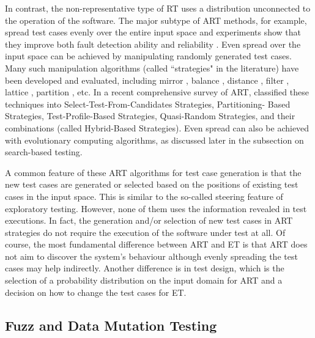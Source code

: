 \documentclass[preprint,1p,authoryear,times]{elsarticle}
\begin{document}
In contrast, the non-representative type of RT uses a distribution unconnected to the operation of the software. The major subtype of ART methods, for example, spread test cases evenly over the entire input space \citep{TYChen2001, TYChen2004, TYChen2007, TYChen_et_al2010} and experiments show that they improve both fault detection ability \citep{TYChen2007b} and reliability \citep{LiuAndZhu2008}. Even spread over the input space can be achieved by manipulating randomly generated test cases. Many such manipulation algorithms (called ``strategies" in the literature) have been developed and evaluated, including mirror \citep{TYChen2004MirrorAR}, balance \citep{TYChen2007BalancingART}, distance \citep{Huang2020}, filter \citep{KPChan2005FilterART}, lattice \citep{Mayer2005LatticebasedAR}, partition \citep{Mao2020}, etc. In a recent comprehensive survey of ART, \citet{Huang2020SurveyART} classified these techniques into Select-Test-From-Candidates Strategies, Partitioning- Based Strategies, Test-Profile-Based Strategies, Quasi-Random Strategies, and their combinations (called Hybrid-Based Strategies). Even spread can also be achieved with evolutionary computing algorithms, as discussed later in the subsection on search-based testing. 

A common feature of these ART algorithms for test case generation is that the new test cases are generated or selected based on the positions of existing test cases in the input space. This is similar to the so-called steering feature of exploratory testing. However, none of them uses the information revealed in test executions. In fact, the generation and/or selection of new test cases in ART strategies do not require the execution of the software under test at all. Of course, the most fundamental difference between ART and ET is that ART does not aim to discover the system's behaviour although evenly spreading the test cases may help indirectly. Another difference is in test design, which is the selection of a probability distribution on the input domain for ART and a decision on how to change the test cases for ET.

\subsection{Fuzz and Data Mutation Testing}
\end{document}
